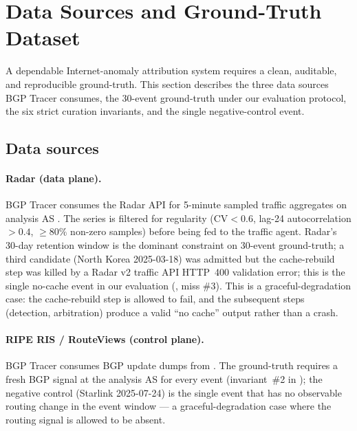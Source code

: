 
\section{Data Sources and Ground-Truth Dataset}
\label{sec:data}

A dependable Internet-anomaly attribution system requires a
clean, auditable, and reproducible ground-truth. This
section describes the three data sources BGP Tracer
consumes, the 30-event ground-truth under our
evaluation protocol, the six strict curation invariants,
and the single negative-control event.

\subsection{Data sources}
\label{sec:data-sources}

\paragraph{\cf{} Radar (data plane).}
BGP Tracer consumes the \cf{} Radar API for 5-minute
sampled traffic aggregates on analysis AS
\cite{cloudflare-radar}. The series is filtered for
regularity ($\mathrm{CV}<0.6$, lag-24 autocorrelation
$>0.4$, $\geq 80\%$ non-zero samples) before being fed
to the traffic agent. \Cf{} Radar's 30-day retention
window is the dominant constraint on 30-event ground-truth;
a third candidate (North Korea 2025-03-18) was admitted
but the cache-rebuild step was killed by a \cf{} Radar
v2 traffic API HTTP~400 validation error; this is the
single no-cache event in our evaluation
(, miss \#3). This is a
graceful-degradation case: the cache-rebuild step is
allowed to fail, and the subsequent steps (detection,
arbitration) produce a valid ``no cache'' output rather
than a crash.

\paragraph{RIPE RIS / RouteViews \rrc{} (control plane).}
BGP Tracer consumes BGP update dumps from \rrc{}
\cite{ripe-ris, routeviews}. The ground-truth
requires a fresh BGP signal at the analysis AS for every
event (invariant~\#2 in );
the negative control (Starlink 2025-07-24) is the single
event that has no observable routing change in the event window --- a
graceful-degradation case where the routing signal is
allowed to be absent.

